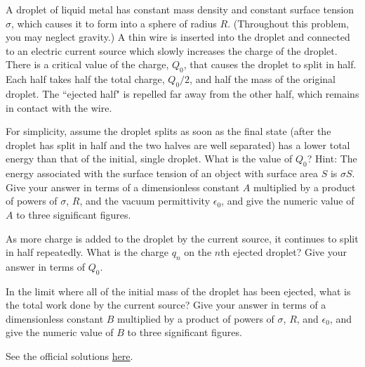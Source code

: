 \documentclass[11pt]{scrartcl}
\newcommand{\officialsol}[1]{See the official solutions \href{#1}{here}.}
\begin{document}
\begin{prob}[USAPhO 2022 A2]
A droplet of liquid metal has constant mass density and constant surface tension $\sigma$, which causes it to form into a sphere of radius $R$. (Throughout this problem, you may neglect gravity.) A thin wire is inserted into the droplet and connected to an electric current source which slowly increases the charge of the droplet. There is a critical value of the charge, $Q_0$, that causes the droplet to split in half. Each half takes half the total charge, $Q_0/2$, and half the mass of the original droplet. The ``ejected half" is repelled far away from the other half, which remains in contact with the wire.
\begin{anum}
    \item For simplicity, assume the droplet splits as soon as the final state (after the droplet has split in half and the two halves are well separated) has a lower total energy than that of the initial, single droplet. What is the value of $Q_0$? Hint: The energy associated with the surface tension of an object with surface area $S$ is $\sigma S$. Give your answer in terms of a dimensionless constant $A$ multiplied by a product of powers of $\sigma$, $R$, and the vacuum permittivity $\epsilon_0$, and give the numeric value of $A$ to three significant figures.
    \item As more charge is added to the droplet by the current source, it continues to split in half repeatedly. What is the charge $q_n$ on the $n$th ejected droplet? Give your answer in terms of $Q_0$.
    \item In the limit where all of the initial mass of the droplet has been ejected, what is the total work done by the current source? Give your answer in terms of a dimensionless constant $B$ multiplied by a product of powers of $\sigma$, $R$, and $\epsilon_0$, and give the numeric value of $B$ to three significant figures.
\end{anum}
\end{prob}

\begin{sol}
    \officialsol{https://www.aapt.org/physicsteam/upload/2022-USAPhO-solutions.pdf}
\end{sol}
\end{document}
